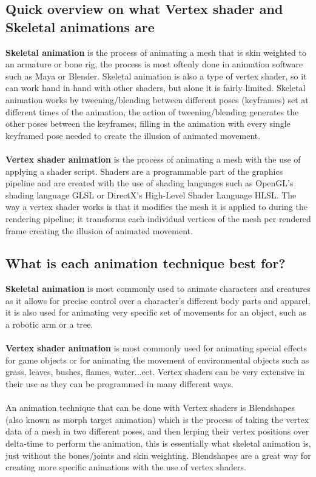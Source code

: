 \documentclass{scrartcl}
\begin{document}
\subsection{Quick overview on what Vertex shader and Skeletal animations are}
\textbf{Skeletal animation} is the process of animating a mesh that is skin weighted to an armature or bone rig, the process is most oftenly done in animation software such as Maya or Blender.
Skeletal animation is also a type of vertex shader, so it can work hand in hand with other shaders, but alone it is fairly limited.\cite{ten}
Skeletal animation works by tweening/blending between different poses (keyframes) set at different times of the animation, the action of tweening/blending generates the other poses between the keyframes, filling in the animation with every single keyframed pose needed to create the illusion of animated movement.
\\~\\
\textbf{Vertex shader animation} is the process of animating a mesh with the use of applying a shader script. Shaders are a programmable part of the graphics pipeline and are created with the use of shading languages such as OpenGL's shading language GLSL or DirectX's High-Level Shader Language HLSL.\cite{twelve}
The way a vertex shader works is that it modifies the mesh it is applied to during the rendering pipeline; it transforms each individual vertices of the mesh per rendered frame creating the illusion of animated movement.\cite{nine}

\subsection{What is each animation technique best for?}
\textbf{Skeletal animation} is most commonly used to animate characters and creatures as it allows for precise control over a character's different body parts and apparel, it is also used for animating very specific set of movements for an object, such as a robotic arm or a tree.\cite{ten}
\\~\\
\textbf{Vertex shader animation} is most commonly used for animating special effects for game objects or for animating the movement of environmental objects such as grass, leaves, bushes, flames, water...ect.\cite{two}\cite{three}\cite{four}\cite{six}
Vertex shaders can be very extensive in their use as they can be programmed in many different ways.
\\~\\
An animation technique that can be done with Vertex shaders is Blendshapes (also known as morph target animation) which is the process of taking the vertex data of a mesh in two different poses, and then lerping their vertex positions over delta-time to perform the animation, this is essentially what skeletal animation is, just without the bones/joints and skin weighting.
Blendshapes are a great way for creating more specific animations with the use of vertex shaders.
\end{document}
